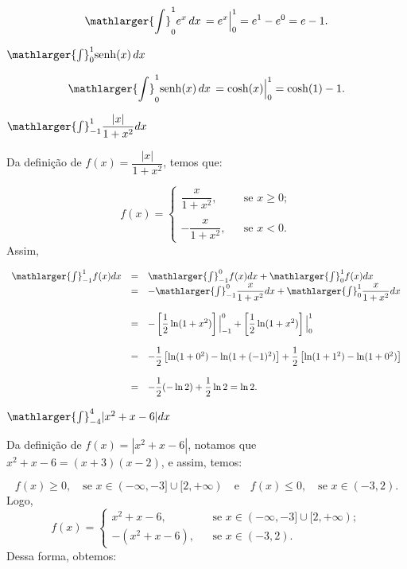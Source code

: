 \cleardoublepage\documentclass[../main.tex]{subfiles}
\begin{document}
\begin{exeresol}
\begin{compactenum}[a)]
  \begin{solution}
  \[ \mathlarger{\int}^{1}_{0} e^x\,dx\,= e^x \Big{|}^{1}_{0} = e^1-e^0=e-1. \]
  \end{solution}
  \item \( \mathlarger{\int}^{1}_{0} {\rm senh}( x)\,dx\)\\
  
  \begin{solution}
  \[ \mathlarger{\int}^{1}_{0} {\rm senh} (x)\,dx\,= \cosh(x) \Big{|}^{1}_{0} = \cosh(1) -1. \]
  \end{solution}
  \item \(\mathlarger{\int}^{1}_{-1}\dfrac{|x|}{1+x^2}dx\)\\
  
  \begin{solution}
  Da definição de \(f(x)=\dfrac{|x|}{1+x^2}\), temos que:

\[ f(x)=\left\{\begin{array}{ccl} \dfrac{x}{1+x^2},& & \mbox{se } x\geq 0;\\ \\ -\dfrac{x}{1+x^2},& & \mbox{se } x< 0. \end{array}\right. \]
Assim,

\[ \begin{array}{rcl} \mathlarger{\int}^{1}_{-1}f(x)dx &=& \mathlarger{\int}^{0}_{-1}f(x)dx + \mathlarger{\int}^{1}_{0}f(x)dx\\ &=& -\mathlarger{\int}^{0}_{-1}\dfrac{x}{1+x^2}dx + \mathlarger{\int}^{1}_{0}\dfrac{x}{1+x^2}dx\\ \\ &=& - \left[\dfrac{1}{2}\ln(1+x^2)\right]\Big{|}^{0}_{-1} + \left[\dfrac{1}{2}\ln(1+x^2)\right]\Big{|}^{1}_{0}\\ \\ &=& - \dfrac{1}{2}\left[\ln(1+0^2)-\ln(1+(-1)^2)\right] + \dfrac{1}{2}\left[\ln(1+1^2)- \ln(1+0^2)\right]\\ \\ &=& -\dfrac{1}{2}(-\ln 2) + \dfrac{1}{2}\ln 2 = \ln 2. \end{array} \]
  \end{solution}
  \item \(\mathlarger{\int}^{4}_{-4}|x^2+x-6|dx\)\\
  
  \begin{solution}
  Da definição de \(f(x)=|x^2+x-6|\), notamos que \(x^2+x-6=(x+3)(x-2)\), e assim, temos:

\[ f(x)\geq 0, \quad \mbox{se } x\in (-\infty,-3] \cup [2,+\infty) \quad \mbox{e}\quad f(x)\leq 0,\quad \mbox{se } x\in(-3,2). \] Logo, \[ f(x)= \left\{\begin{array}{ccl} x^2+x-6,& & \mbox{se } x\in (-\infty,-3] \cup [2,+\infty);\\ -(x^2+x-6),& & \mbox{se } x\in(-3,2). \end{array}\right. \]
Dessa forma, obtemos:


\end{solution}
\end{compactenum}
\end{exeresol}
\end{document}
